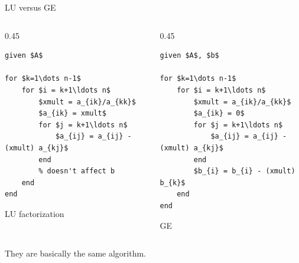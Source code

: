 \documentclass[10pt]{beamer}
\begin{document}
\begin{frame}[fragile]{LU versus GE}
\begin{columns}
    \begin{column}{0.45\textwidth}
\begin{lstlisting}[mathescape]
given $A$
                           
for $k=1\dots n-1$          
    for $i = k+1\ldots n$      
        $xmult = a_{ik}/a_{kk}$
        $a_{ik} = xmult$      
        for $j = k+1\ldots n$      
            $a_{ij} = a_{ij} - (xmult) a_{kj}$
        end                      
        % doesn't affect b
    end                        
end                          
\end{lstlisting}
\begin{center}
    LU factorization 
\end{center}
    \end{column}
    \begin{column}{0.45\textwidth}
\begin{lstlisting}[mathescape,label=algo:fwdelim]
given $A$, $b$
                               
for $k=1\dots n-1$          
    for $i = k+1\ldots n$      
        $xmult = a_{ik}/a_{kk}$
        $a_{ik} = 0$     
        for $j = k+1\ldots n$      
            $a_{ij} = a_{ij} - (xmult) a_{kj}$
        end                      
        $b_{i} = b_{i} - (xmult) b_{k}$
    end                        
end                          
\end{lstlisting}
\begin{center}
    GE
\end{center}
    \end{column}
\end{columns}
\vspace{0.5cm}
\begin{center}
They are basically the same algorithm.
\end{center}
\end{frame}
\end{document}
